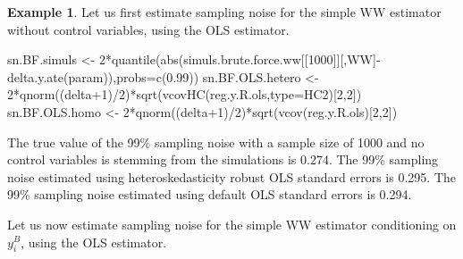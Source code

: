 \documentclass[
]{book}
\newenvironment{Shaded}{\begin{snugshade}}{\end{snugshade}}
\newcommand{\AttributeTok}[1]{\textcolor[rgb]{0.77,0.63,0.00}{#1}}
\newcommand{\DecValTok}[1]{\textcolor[rgb]{0.00,0.00,0.81}{#1}}
\newcommand{\FloatTok}[1]{\textcolor[rgb]{0.00,0.00,0.81}{#1}}
\newcommand{\FunctionTok}[1]{\textcolor[rgb]{0.00,0.00,0.00}{#1}}
\newcommand{\NormalTok}[1]{#1}
\newcommand{\OtherTok}[1]{\textcolor[rgb]{0.56,0.35,0.01}{#1}}
\newcommand{\SpecialCharTok}[1]{\textcolor[rgb]{0.00,0.00,0.00}{#1}}
\newcommand{\StringTok}[1]{\textcolor[rgb]{0.31,0.60,0.02}{#1}}
\theoremstyle{definition}
\theoremstyle{definition}
\newtheorem{example}{Example}[chapter]
\theoremstyle{definition}
\theoremstyle{definition}
\theoremstyle{remark}
\begin{document}
\begin{example}
\protect\hypertarget{exm:unnamed-chunk-77}{}{\label{exm:unnamed-chunk-77} }Let us first estimate sampling noise for the simple WW estimator without control variables, using the OLS estimator.
\end{example}

\begin{Shaded}
\begin{Highlighting}[]
\NormalTok{sn.BF.simuls }\OtherTok{\textless{}{-}} \DecValTok{2}\SpecialCharTok{*}\FunctionTok{quantile}\NormalTok{(}\FunctionTok{abs}\NormalTok{(simuls.brute.force.ww[[}\StringTok{\textquotesingle{}1000\textquotesingle{}}\NormalTok{]][,}\StringTok{\textquotesingle{}WW\textquotesingle{}}\NormalTok{]}\SpecialCharTok{{-}}\FunctionTok{delta.y.ate}\NormalTok{(param)),}\AttributeTok{probs=}\FunctionTok{c}\NormalTok{(}\FloatTok{0.99}\NormalTok{))}
\NormalTok{sn.BF.OLS.hetero }\OtherTok{\textless{}{-}} \DecValTok{2}\SpecialCharTok{*}\FunctionTok{qnorm}\NormalTok{((delta}\SpecialCharTok{+}\DecValTok{1}\NormalTok{)}\SpecialCharTok{/}\DecValTok{2}\NormalTok{)}\SpecialCharTok{*}\FunctionTok{sqrt}\NormalTok{(}\FunctionTok{vcovHC}\NormalTok{(reg.y.R.ols,}\AttributeTok{type=}\StringTok{\textquotesingle{}HC2\textquotesingle{}}\NormalTok{)[}\DecValTok{2}\NormalTok{,}\DecValTok{2}\NormalTok{])}
\NormalTok{sn.BF.OLS.homo }\OtherTok{\textless{}{-}} \DecValTok{2}\SpecialCharTok{*}\FunctionTok{qnorm}\NormalTok{((delta}\SpecialCharTok{+}\DecValTok{1}\NormalTok{)}\SpecialCharTok{/}\DecValTok{2}\NormalTok{)}\SpecialCharTok{*}\FunctionTok{sqrt}\NormalTok{(}\FunctionTok{vcov}\NormalTok{(reg.y.R.ols)[}\DecValTok{2}\NormalTok{,}\DecValTok{2}\NormalTok{])}
\end{Highlighting}
\end{Shaded}

The true value of the 99\% sampling noise with a sample size of 1000 and no control variables is stemming from the simulations is 0.274.
The 99\% sampling noise estimated using heteroskedasticity robust OLS standard errors is 0.295.
The 99\% sampling noise estimated using default OLS standard errors is 0.294.

Let us now estimate sampling noise for the simple WW estimator conditioning on \(y_i^B\), using the OLS estimator.
\end{document}
